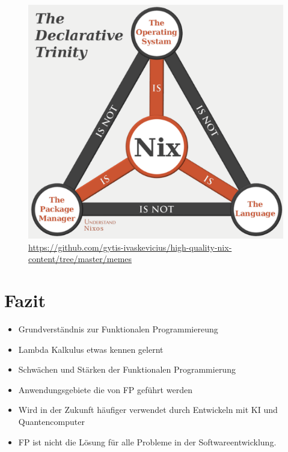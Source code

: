 \documentclass{beamer}
\begin{document}
\begin{frame}
    \begin{figure}
    \centering
    \includegraphics[width=0.7\linewidth]{bilder/nix.png}
    \textmd{\tiny \url{https://github.com/gytis-ivaskevicius/high-quality-nix-content/tree/master/memes} }
\end{figure}

\end{frame}

\section{Fazit}
\begin{frame}
	\begin{itemize}
		\item Grundverständnis zur Funktionalen Programmiereung
		\item Lambda Kalkulus etwas kennen gelernt
		\item Schwächen und Stärken der Funktionalen Programmierung
         \item Anwendungsgebiete die von FP geführt werden
         \item Wird in der Zukunft häufiger verwendet durch Entwickeln mit KI und Quantencomputer
         \item FP ist nicht die Lösung für alle Probleme in der Softwareentwicklung.

        \end{itemize}
\end{frame}
\end{document}
